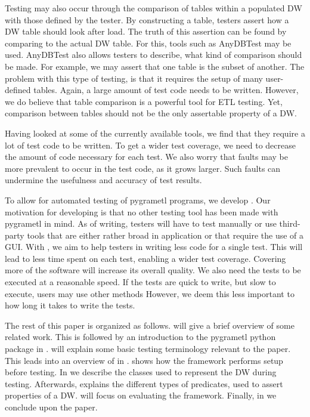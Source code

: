 Testing may also occur through the comparison of tables within a populated DW with those defined by the tester. By constructing a table, testers assert how a DW table should look after load. The truth of this assertion can be found by comparing to the actual DW table. For this, tools such as AnyDBTest\cite{AnyDbTest} may be used. AnyDBTest also allows testers to describe, what kind of comparison should be made. For example, we may assert that one table is the subset of another. The problem with this type of testing, is that it requires the setup of many user-defined tables. Again, a large amount of test code needs to be written. However, we do believe that table comparison is a powerful tool for ETL testing. Yet, comparison between tables should not be the only assertable property of a DW.

Having looked at some of the currently available tools, we find that they require a lot of test code to be written. To get a wider test coverage, we need to decrease the amount of code necessary for each test. We also worry that faults may be more prevalent to occur in the test code, as it grows larger. Such faults can undermine the usefulness and accuracy of test results.

To allow for automated testing of pygrametl programs, we develop \textit{\FW{}}. Our motivation for developing \FW{} is that no other testing tool has been made with pygrametl in mind. As of writing, testers will have to test manually or use third-party tools that are either rather broad in application or that require the use of a GUI. With \FW{}, we aim to help testers in writing less code for a single test. This will lead to less time spent on each test, enabling a wider test coverage. Covering more of the software will increase its overall quality. We also need the tests to be executed at a reasonable speed. If the tests are quick to write, but slow to execute, users may use other methods However, we deem this less important to how long it takes to write the tests.

The rest of this paper is organized as follows.  will give a brief overview of some related work. This is followed by an introduction to the pygrametl python package in .  will explain some basic testing terminology relevant to the paper. This leads into an overview of \FW{} in .  shows how the framework performs setup before testing. In  we describe the classes used to represent the DW during testing. Afterwards,  explains the different types of predicates, used to assert properties of a DW.  will focus on evaluating the framework. Finally, in  we conclude upon the paper.





 




